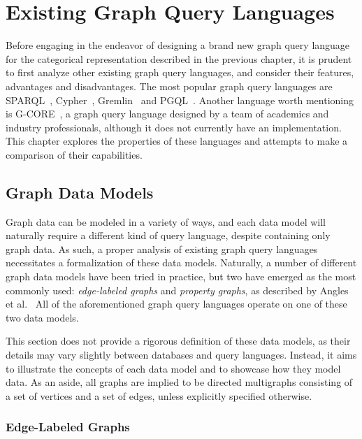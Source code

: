 \chapter{Existing Graph Query Languages}
\label{querylanguages}

Before engaging in the endeavor of designing a brand new graph query language for the categorical representation described in the previous chapter, it is prudent to first analyze other existing graph query languages, and consider their features, advantages and disadvantages. The most popular graph query languages are SPARQL~\cite{sparql}, Cypher~\cite{opencypher}, Gremlin~\cite{gremlin} and PGQL~\cite{pgql}.
Another language worth mentioning is G-CORE~\cite{gcore}, a graph query language designed by a team of academics and industry professionals, although it does not currently have an implementation.
This chapter explores the properties of these languages and attempts to make a comparison of their capabilities.

\section{Graph Data Models}
\label{querylanguages:section:graphdatamodels}

Graph data can be modeled in a variety of ways, and each data model will naturally require a different kind of query language, despite containing only graph data.
As such, a proper analysis of existing graph query languages necessitates a formalization of these data models.
Naturally, a number of different graph data models have been tried in practice, but two have emerged as the most commonly used: \textit{edge-labeled graphs} and \textit{property graphs}, as described by Angles et al.~\cite{foundations_query_languages}
All of the aforementioned graph query languages operate on one of these two data models.

This section does not provide a rigorous definition of these data models, as their details may vary slightly between databases and query languages.
Instead, it aims to illustrate the concepts of each data model and to showcase how they model data.
As an aside, all graphs are implied to be directed multigraphs consisting of a set of vertices and a set of edges, unless explicitly specified otherwise.

\subsection{Edge-Labeled Graphs}
\label{querylanguages:subsection:edgelabeled}


